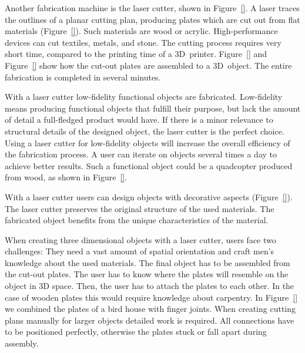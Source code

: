 \documentclass[../ClassicThesis.tex]{subfiles}
\begin{document}
Another fabrication machine is the laser cutter, shown in
Figure~\ref{}. A laser traces the outlines of a
planar cutting plan, producing plates which are cut out from
flat materials (Figure~\ref{}). Such materials
are wood or acrylic. High-performance devices can cut
textiles, metals, and stone. The cutting process requires
very short time, compared to the printing time of a
3D~printer. Figure~\ref{} and Figure~\ref{} show how the
cut-out plates are assembled to a 3D~object. The entire
fabrication is completed in several minutes.

With a laser cutter low-fidelity functional objects are
fabricated. Low-fidelity means producing functional objects
that fulfill their purpose, but lack the amount of detail a
full-fledged product would have. If there is a minor
relevance to structural details of the designed object, the
laser cutter is the perfect choice. Using a laser cutter for
low-fidelity objects will increase the overall efficiency of
the fabrication process. A user can iterate on objects
several times a day to achieve better results.
Such a
functional object could be a quadcopter produced from wood, as shown
in Figure~\ref{}.

With a laser cutter users can design objects with decorative
aspects (Figure~\ref{}). The laser cutter
preserves the original structure of the used materials. The
fabricated object benefits from the unique characteristics
of the material.


When creating three dimensional objects with a laser cutter,
users face two challenges: They need a vast amount of
spatial orientation and craft men's knowledge about the used
materials. The final object has to be assembled from the
cut-out plates. The user has to know where the plates will
resemble on the object in 3D space. Then, the user has to
attach the plates to each other. In the case of wooden
plates this would require knowledge about carpentry. In
Figure~\ref{} we combined the plates of a bird
house with finger joints. When creating cutting plans
manually for larger objects detailed work is
required. All connections have to be positioned perfectly,
otherwise the plates stuck or fall apart during assembly.
\end{document}
